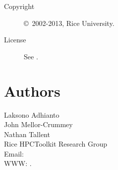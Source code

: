 \documentclass[english]{article}
\begin{document}
\begin{description}
\item[Copyright] \copyright\ 2002-2013, Rice University.
\item[License] See .
\end{description}

\section{Authors}

\noindent
Laksono Adhianto \\
John Mellor-Crummey \\
Nathan Tallent \\
Rice HPCToolkit Research Group \\
Email:  \\
WWW: .

\LatexManEnd
\end{document}
